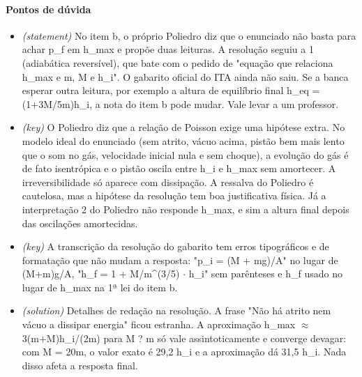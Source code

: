 \documentclass{article}%
\begin{document}
\paragraph{Pontos de dúvida}%
\begin{itemize}%
\item%
\textit{(statement)} No item b, o próprio Poliedro diz que o enunciado não basta para achar p\_f em h\_max e propõe duas leituras. A resolução seguiu a 1 (adiabática reversível), que bate com o pedido de "equação que relaciona h\_max e m, M e h\_i". O gabarito oficial do ITA ainda não saiu. Se a banca esperar outra leitura, por exemplo a altura de equilíbrio final h\_eq = (1+3M/5m)h\_i, a nota do item b pode mudar. Vale levar a um professor.%
\item%
\textit{(key)} O Poliedro diz que a relação de Poisson exige uma hipótese extra. No modelo ideal do enunciado (sem atrito, vácuo acima, pistão bem mais lento que o som no gás, velocidade inicial nula e sem choque), a evolução do gás é de fato isentrópica e o pistão oscila entre h\_i e h\_max sem amortecer. A irreversibilidade só aparece com dissipação. A ressalva do Poliedro é cautelosa, mas a hipótese da resolução tem boa justificativa física. Já a interpretação 2 do Poliedro não responde h\_max, e sim a altura final depois das oscilações amortecidas.%
\item%
\textit{(key)} A transcrição da resolução do gabarito tem erros tipográficos e de formatação que não mudam a resposta: "p\_i = (M + mg)/A" no lugar de (M+m)g/A, "h\_f = 1 + M/m\^{}(3/5) $\cdot$ h\_i" sem parênteses e h\_f usado no lugar de h\_max na 1ª lei do item b.%
\item%
\textit{(solution)} Detalhes de redação na resolução. A frase "Não há atrito nem vácuo a dissipar energia" ficou estranha. A aproximação h\_max $\approx$ 3(m+M)h\_i/(2m) para M ? m só vale assintoticamente e converge devagar: com M = 20m, o valor exato é 29,2 h\_i e a aproximação dá 31,5 h\_i. Nada disso afeta a resposta final.%
\end{itemize}%
\end{document}
